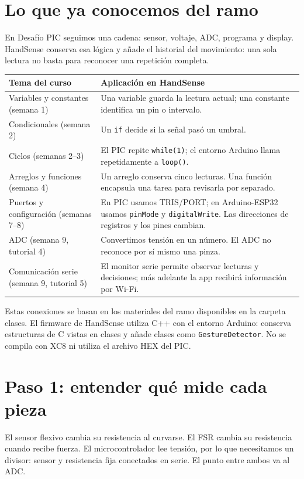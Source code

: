 \documentclass[11pt,a4paper]{article}
\begin{document}
\section{Lo que ya conocemos del ramo}
En Desafío PIC seguimos una cadena: sensor, voltaje, ADC, programa y display. HandSense conserva esa lógica y añade el historial del movimiento: una sola lectura no basta para reconocer una repetición completa.
\begin{longtable}{p{.25\linewidth}p{.65\linewidth}}
\toprule Tema del curso & Aplicación en HandSense\\\midrule
Variables y constantes (semana 1) & Una variable guarda la lectura actual; una constante identifica un pin o intervalo.\\
Condicionales (semana 2) & Un \texttt{if} decide si la señal pasó un umbral.\\
Ciclos (semanas 2--3) & El PIC repite \texttt{while(1)}; el entorno Arduino llama repetidamente a \texttt{loop()}.\\
Arreglos y funciones (semana 4) & Un arreglo conserva cinco lecturas. Una función encapsula una tarea para revisarla por separado.\\
Puertos y configuración (semanas 7--8) & En PIC usamos TRIS/PORT; en Arduino-ESP32 usamos \texttt{pinMode} y \texttt{digitalWrite}. Las direcciones de registros y los pines cambian.\\
ADC (semana 9, tutorial 4) & Convertimos tensión en un número. El ADC no reconoce por sí mismo una pinza.\\
Comunicación serie (semana 9, tutorial 5) & El monitor serie permite observar lecturas y decisiones; más adelante la app recibirá información por Wi-Fi.\\\bottomrule
\end{longtable}
Estas conexiones se basan en los materiales del ramo disponibles en la carpeta clases. El firmware de HandSense utiliza C++ con el entorno Arduino: conserva estructuras de C vistas en clases y añade clases como \texttt{GestureDetector}. No se compila con XC8 ni utiliza el archivo HEX del PIC.

\section{Paso 1: entender qué mide cada pieza}
El sensor flexivo cambia su resistencia al curvarse. El FSR cambia su resistencia cuando recibe fuerza. El microcontrolador lee tensión, por lo que necesitamos un divisor: sensor y resistencia fija conectados en serie. El punto entre ambos va al ADC.
\end{document}
